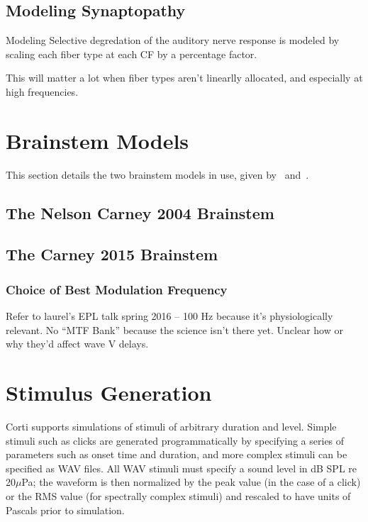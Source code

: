\subsection{Modeling Synaptopathy} %
\label{sub:modeling_synaptopathy}
Modeling 
Selective degredation of the auditory nerve response is modeled by scaling each fiber type at each CF by a percentage factor.  

This will matter a lot when fiber types aren't linearlly allocated, and especially at high frequencies.

\section{Brainstem Models} %
\label{sec:brainstem_models}
This section details the two brainstem models in use, given by~\cite{Nelson2004Phenomenological} and~\cite{Carney2015Speech}.

\subsection{The Nelson Carney 2004 Brainstem} %
\label{sub:the_nelson_carney_2004_brainstem}

\subsection{The Carney 2015 Brainstem} %
\label{sub:the_carney_2015_brainstem}

\subsubsection{Choice of Best Modulation Frequency}
Refer to laurel's EPL talk spring 2016 -- 100 Hz because it's physiologically relevant.  No ``MTF Bank'' because the science isn't there yet. Unclear how or why they'd affect wave V delays. 

\section{Stimulus Generation} %
\label{sec:stimulus_generation}
Corti supports simulations of stimuli of arbitrary duration and level.  Simple stimuli such as clicks are generated programmatically by specifying a series of parameters such as onset time and duration, and more complex stimuli can be specified as WAV files.  All WAV stimuli must specify a sound level in dB SPL re 20$\mu$Pa; the waveform is then normalized by the peak value (in the case of a click) or the RMS value (for spectrally complex stimuli) and rescaled to have units of Pascals prior to simulation.
